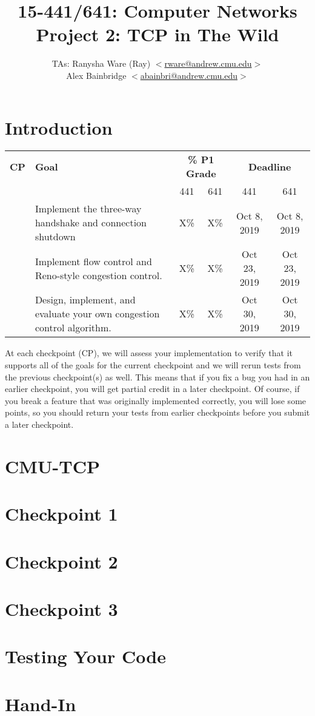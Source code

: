 \documentclass[10pt,letterpaper]{article}
\title{ 15-441/641: Computer Networks\\ Project 2: TCP in The Wild\\ }
\author{TAs: Ranysha Ware (Ray)
             $<$\href{mailto:rware@andrew.cmu.edu }{rware@andrew.cmu.edu}$>$ \\
              Alex Bainbridge
             $<$\href{mailto:abainbri@andrew.cmu.edu}{abainbri@andrew.cmu.edu}$>$}
\begin{document}
\maketitle

\section{Introduction} 


\begin{center}
\vspace{10pt}
\begin{tabular}{cp{2.5in}cccc}
  {\bf CP}&{\bf Goal}&\multicolumn{2}{c}{{\bf \% P1 Grade}}&\multicolumn{2}{c}{{\bf Deadline}}\\
  & & 441 & 641 & 441 & 641 \\

  \hline
  
  \addlinespace[5pt]
  1&Implement the three-way handshake and connection shutdown& X\% & X\% & Oct 8, 2019 & Oct 8, 2019 \\
  
  \addlinespace[5pt]
  2&Implement flow control and Reno-style congestion control. & X\% & X\% & Oct 23, 2019 & Oct 23, 2019   \\
  
  \addlinespace[5pt]
  3&Design, implement, and evaluate your own congestion control algorithm. & X\% & X\% & Oct 30, 2019 & Oct 30, 2019\\
\end{tabular}
\end{center}

\noindent At each checkpoint (CP), we will assess your implementation to
verify that it supports all of the goals for the current checkpoint
and we will rerun tests from the previous checkpoint(s) as well.  This
means that if you fix a bug you had in an earlier checkpoint, you will
get partial credit in a later checkpoint.  Of course, if you break a
feature that was originally implemented correctly, you will lose some
points, so you should return your tests from earlier checkpoints
before you submit a later checkpoint.  
%
\section{CMU-TCP}


\section{Checkpoint 1}

\section{Checkpoint 2}


\section{Checkpoint 3}
 

\section{Testing Your Code}

\section{Hand-In}
\label{sec:handin}




\end{document}
